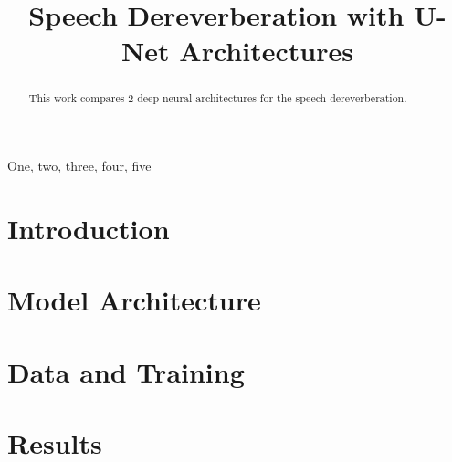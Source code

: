 \documentclass{article}
\title{Speech Dereverberation with U-Net Architectures}
\begin{document}
%

\maketitle
%
\begin{abstract}
This work compares 2 deep neural architectures for the speech dereverberation. 
\end{abstract}
%
\begin{keywords}
One, two, three, four, five
\end{keywords}
%
\section{Introduction}
\label{sec:intro}


\section{Model Architecture}%
\label{sec:model_architecture}


\section{Data and Training}%
\label{sec:data_and_training}


\section{Results}%
\label{sec:results}






\end{document}
